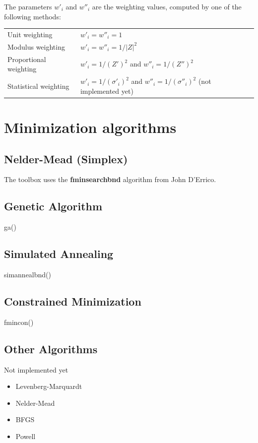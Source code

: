 \documentclass[10pt,b5paper,oneside]{book}
\begin{document}
The parameters $w'_i$ and $w''_i$ are the weighting values, computed by one of the following methods:

\begin{tabular}{ll}
	Unit weighting 			& $w'_i = w''_i = 1$ \\
	Modulus weighting 		& $w'_i = w''_i = 1/|Z|^2$ \\
	Proportional weighting 	& $w'_i = 1/(Z')^2$ and $w''_i = 1/(Z'')^2$ \\
	Statistical weighting 	& $w'_i = 1/(\sigma'_i)^2$ and $w''_i = 1/(\sigma''_i)^2$ (not implemented yet)\\
\end{tabular}


\newpage
\section{Minimization algorithms}

\subsection{Nelder-Mead (Simplex)}

The toolbox uses the \textbf{fminsearchbnd} algorithm from John D'Errico.

\subsection{Genetic Algorithm}

ga()

\subsection{Simulated Annealing}

simannealbnd()

\subsection{Constrained Minimization}

fmincon()

\subsection{Other Algorithms}

Not implemented yet

\begin{itemize}
	\item Levenberg-Marquardt
	\item Nelder-Mead
	\item BFGS
	\item Powell
\end{itemize}
\end{document}
